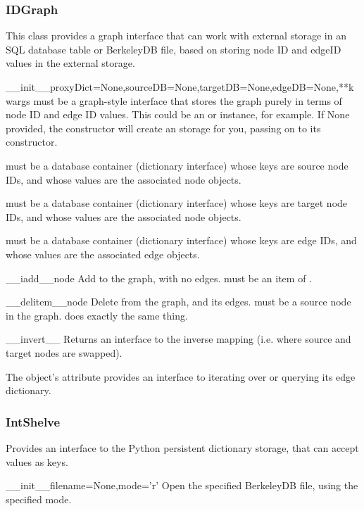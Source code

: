 \documentclass{howto}
\begin{document}
\subsubsection{IDGraph}
This class provides a graph interface that can work with external storage
in an SQL database table or BerkeleyDB file, based on storing node ID and
edgeID values in the external storage.
\begin{funcdesc}{__init__}{proxyDict=None,sourceDB=None,targetDB=None,edgeDB=None,**kwargs}
   must be a graph-style interface that stores the graph
  purely in terms of node ID and edge ID values.  This could be an 
  or  instance, for example.  If None provided,
  the constructor will create an  storage for you, passing
  on  to its constructor.

   must be a database container (dictionary interface) whose
  keys are source node IDs, and whose values are the associated node objects.

   must be a database container (dictionary interface) whose
  keys are target node IDs, and whose values are the associated node objects.

   must be a database container (dictionary interface) whose
  keys are edge IDs, and whose values are the associated edge objects.
\end{funcdesc}

\begin{funcdesc}{__iadd__}{node}
  Add  to the graph, with no edges.   must be an
  item of .
\end{funcdesc}

\begin{funcdesc}{__delitem__}{node}
  Delete  from the graph, and its edges.   must be a
  source node in the graph.   does exactly the same thing.
\end{funcdesc}

\begin{funcdesc}{__invert__}{}
  Returns an  interface to the inverse mapping
  (i.e. where source and target nodes are swapped).
\end{funcdesc}

The object's  attribute provides an interface to iterating
over or querying its edge dictionary.

\subsubsection{IntShelve}
Provides an interface to the Python  persistent dictionary
storage, that can accept  values as keys.
\begin{funcdesc}{__init__}{filename=None,mode='r'}
  Open the specified  BerkeleyDB file, using the specified
  mode.
\end{funcdesc}
\end{document}
